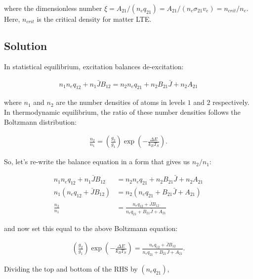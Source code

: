 \documentclass[12pt]{article}
\begin{document}
where the dimensionless number $\xi = A_{21}/(n_eq_{21}) = A_{21}/(n_e\sigma_{21}v_e) = n_{crit}/n_e$. Here, $n_{crit}$ is the critical density for matter LTE.


\subsection*{Solution}

In statistical equilibrium, excitation balances de-excitation:

\begin{align*}
n_1n_eq_{12} + n_1\bar{J}B_{12} = n_2n_eq_{21} + n_2B_{21}\bar{J} + n_2A_{21}
\end{align*}

where $n_1$ and $n_2$ are the number densities of atoms in levels $1$ and $2$ respectively. In thermodynamic equilibrium, the ratio of these number densities follows the Boltzmann distribution:

\begin{align*}
\frac{n_2}{n_1} = \left(\frac{g_2}{g_1}\right)\exp\left(-\frac{\Delta E}{k_BT_S}\right).
\end{align*}

So, let's re-write the balance equation in a form that gives us $n_2/n_1$:

\begin{equation*}
\begin{split}
n_1n_eq_{12} + n_1\bar{J}B_{12} &= n_2n_eq_{21} + n_2B_{21}\bar{J} + n_2A_{21}\\
n_1( n_eq_{12} + \bar{J}B_{12} ) &= n_2( n_eq_{21} + B_{21}\bar{J} + A_{21} )\\
\frac{n_2}{n_1} &= \frac{ n_eq_{12} + \bar{J}B_{12}}{n_eq_{21} + B_{21}\bar{J} + A_{21}}
\end{split}
\end{equation*}

and now set this equal to the above Boltzmann equation:

\begin{align*}
\left(\frac{g_2}{g_1}\right)\exp\left(-\frac{\Delta E}{k_BT_S}\right) = \frac{ n_eq_{12} + \bar{J}B_{12}}{n_eq_{21} + B_{21}\bar{J} + A_{21}}.
\end{align*}

Dividing the top and bottom of the RHS by $(n_eq_{21})$, 
\end{document}
